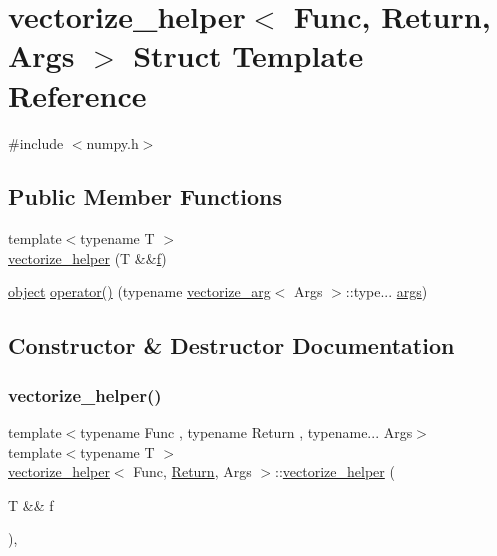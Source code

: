 \hypertarget{structvectorize__helper}{}\section{vectorize\+\_\+helper$<$ Func, Return, Args $>$ Struct Template Reference}
\label{structvectorize__helper}


{\ttfamily \#include $<$numpy.\+h$>$}

\subsection*{Public Member Functions}
\begin{DoxyCompactItemize}
\item 
{\footnotesize template$<$typename T $>$ }\\\mbox{\hyperlink{structvectorize__helper_af05224004f4912718f47e98245b9efa7}{vectorize\+\_\+helper}} (T \&\&\mbox{\hyperlink{_s_d_l__opengl__glext_8h_a691492ec0bd6383f91200e49f6ae40ed}{f}})
\item 
\mbox{\hyperlink{classobject}{object}} \mbox{\hyperlink{structvectorize__helper_a02c424f9db2ec2f63c23741d908acd3f}{operator()}} (typename \mbox{\hyperlink{structvectorize__arg}{vectorize\+\_\+arg}}$<$ Args $>$\+::type... \mbox{\hyperlink{classargs}{args}})
\end{DoxyCompactItemize}


\subsection{Constructor \& Destructor Documentation}
\mbox{\label{structvectorize__helper_af05224004f4912718f47e98245b9efa7}} 
\subsubsection{\texorpdfstring{vectorize\_helper()}{vectorize\_helper()}}
{\footnotesize\ttfamily template$<$typename Func , typename Return , typename... Args$>$ \\
template$<$typename T $>$ \\
\mbox{\hyperlink{structvectorize__helper}{vectorize\+\_\+helper}}$<$ Func, \mbox{\hyperlink{_python-ast_8h_abdae7f49d66ce8e500825bb53aa14901}{Return}}, Args $>$\+::\mbox{\hyperlink{structvectorize__helper}{vectorize\+\_\+helper}} (\begin{DoxyParamCaption}\item[{T \&\&}]{f }\end{DoxyParamCaption})\hspace{0.3cm}{\ttfamily [inline]}, {\ttfamily [explicit]}}



